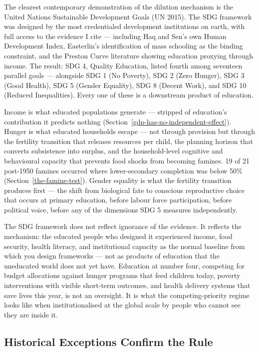 \documentclass[12pt,letterpaper]{article}
\begin{document}
The clearest contemporary demonstration of the dilution mechanism is
the United Nations Sustainable Development Goals (UN 2015). The SDG
framework was designed by the most credentialed development
institutions on earth, with full access to the evidence I
cite --- including Haq and Sen's own Human Development Index,
Easterlin's identification of mass schooling as the binding
constraint, and the Preston Curve literature showing education
proxying through income. The result: SDG 4, Quality Education, listed
fourth among seventeen parallel goals --- alongside SDG 1 (No
Poverty), SDG 2 (Zero Hunger), SDG 3 (Good Health), SDG 5 (Gender
Equality), SDG 8 (Decent Work), and SDG 10 (Reduced Inequalities).
Every one of these is a downstream product of education.

Income is what educated populations generate --- stripped of education's
contribution it predicts nothing
(Section~\ref{gdp-has-no-independent-effect}). Hunger is what educated
households escape --- not through provision but through the fertility
transition that releases resources per child, the planning horizon that
converts subsistence into surplus, and the household-level cognitive and
behavioural capacity that prevents food shocks from becoming famines.
19 of 21 post-1950 famines occurred where lower-secondary completion
was below 50\% (Section~\ref{the-famine-test}). Gender equality
is what the fertility transition produces first --- the shift from
biological fate to conscious reproductive choice that occurs at primary
education, before labour force participation, before political voice,
before any of the dimensions SDG 5 measures independently.

The SDG framework does not reflect ignorance of the evidence. It reflects the
mechanism: the educated people who designed it experienced income, food
security, health literacy, and institutional capacity as the normal
baseline from which you design frameworks --- not as products of
education that the uneducated world does not yet have. Education at
number four, competing for budget allocations against hunger programs
that feed children today, poverty interventions with visible short-term
outcomes, and health delivery systems that save lives this year, is not
an oversight. It is what the competing-priority regime looks like when
institutionalised at the global scale by people who cannot see they are
inside it.

\subsection{Historical Exceptions Confirm the Rule}\label{historical-exceptions-confirm-the-rule}
\end{document}
